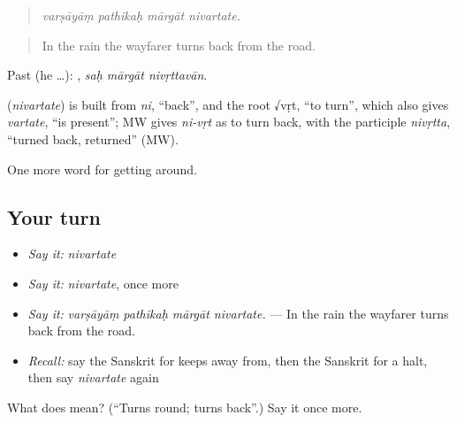 \begin{quote}
   
\end{quote}

\begin{quote}
\emph{varṣāyāṃ pathikaḥ mārgāt nivartate.}
\end{quote}

\begin{quote}
In the rain the wayfarer turns back from the road.
\end{quote}

Past (he …):   , \emph{saḥ mārgāt nivṛttavān}.

\begin{cousinweb}
\textbf{} (\emph{nivartate}) is built from \emph{ni}, \textquotedblleft{}back\textquotedblright{}, and the root √vṛt, \textquotedblleft{}to turn\textquotedblright{}, which also gives \emph{vartate}, \textquotedblleft{}is present\textquotedblright{}; MW gives \emph{ni-vṛt} as to turn back, with the participle \emph{nivṛtta}, \textquotedblleft{}turned back, returned\textquotedblright{} (MW).
\end{cousinweb}

\begin{grammarlens}[title={What you've built}]
One more word for getting around.
\end{grammarlens}

\subsection*{Your turn}
\begin{itemize}
\raggedright
  \item \emph{Say it:} \emph{nivartate}
  \item \emph{Say it:} \emph{nivartate}, once more
  \item \emph{Say it:} \emph{varṣāyāṃ pathikaḥ mārgāt nivartate.} — In the rain the wayfarer turns back from the road.
  \item \emph{Recall:} say the Sanskrit for keeps away from, then the Sanskrit for a halt, then say \emph{nivartate} again
\end{itemize}

\begin{tcolorbox}[breakable,colback=teal!4,colframe=teal!35!black,title={Before you move on}]
What does  mean? (\textquotedblleft{}Turns round; turns back\textquotedblright{}.) Say it once more.
\end{tcolorbox}
